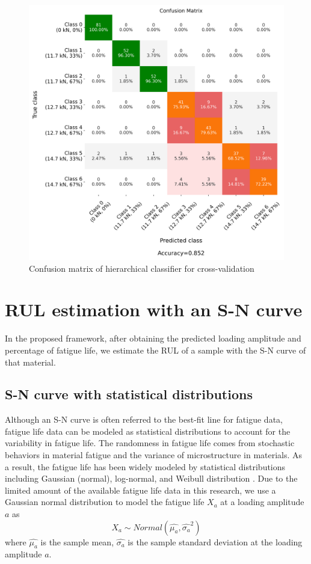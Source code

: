 \begin{figure}[tb]
    \includegraphics[width=0.9\linewidth]{fig/hierarchical_confusion_matrix.png}
    \caption{Confusion matrix of hierarchical classifier for cross-validation}
    \label{fig: confu mat hier}
\end{figure}


\section{RUL estimation with an S-N curve}
In the proposed framework, after obtaining the predicted loading amplitude and percentage of fatigue life, we estimate the RUL of a sample with the S-N curve of that material.

\subsection{S-N curve with statistical distributions}
\label{subsec: statistical sn curve}
Although an S-N curve is often referred to the best-fit line for fatigue data, fatigue life data can be modeled as statistical distributions to account for the variability in fatigue life. The randomness in fatigue life comes from stochastic behaviors in material fatigue and the variance of microstructure in materials. As a result, the fatigue life has been widely modeled by statistical distributions including Gaussian (normal), log-normal, and Weibull distribution \cite{sn-curve-statistical-model-LI2016}. Due to the limited amount of the available fatigue life data in this research, we use a Gaussian normal distribution to model the fatigue life $X_a$ at a loading amplitude $a$ as
\begin{equation}
    X_a \sim Normal(\hat{\mu_{a}}, \hat{\sigma_{a}}^2)
\end{equation}
where $\hat{\mu_{a}}$ is the sample mean, $\hat{\sigma_{a}}$ is the sample standard deviation at the loading amplitude $a$.

